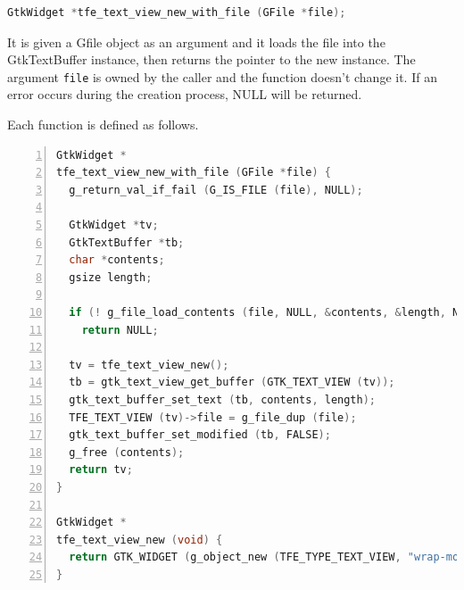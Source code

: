 \begin{lstlisting}[language=C]
GtkWidget *tfe_text_view_new_with_file (GFile *file);
\end{lstlisting}

It is given a Gfile object as an argument and it loads the file into the
GtkTextBuffer instance, then returns the pointer to the new instance.
The argument \passthrough{\lstinline!file!} is owned by the caller and
the function doesn't change it. If an error occurs during the creation
process, NULL will be returned.

Each function is defined as follows.

\begin{lstlisting}[language=C, numbers=left]
GtkWidget *
tfe_text_view_new_with_file (GFile *file) {
  g_return_val_if_fail (G_IS_FILE (file), NULL);

  GtkWidget *tv;
  GtkTextBuffer *tb;
  char *contents;
  gsize length;

  if (! g_file_load_contents (file, NULL, &contents, &length, NULL, NULL)) /* read error */
    return NULL;

  tv = tfe_text_view_new();
  tb = gtk_text_view_get_buffer (GTK_TEXT_VIEW (tv));
  gtk_text_buffer_set_text (tb, contents, length);
  TFE_TEXT_VIEW (tv)->file = g_file_dup (file);
  gtk_text_buffer_set_modified (tb, FALSE);
  g_free (contents);
  return tv;
}

GtkWidget *
tfe_text_view_new (void) {
  return GTK_WIDGET (g_object_new (TFE_TYPE_TEXT_VIEW, "wrap-mode", GTK_WRAP_WORD_CHAR, NULL));
}
\end{lstlisting}

